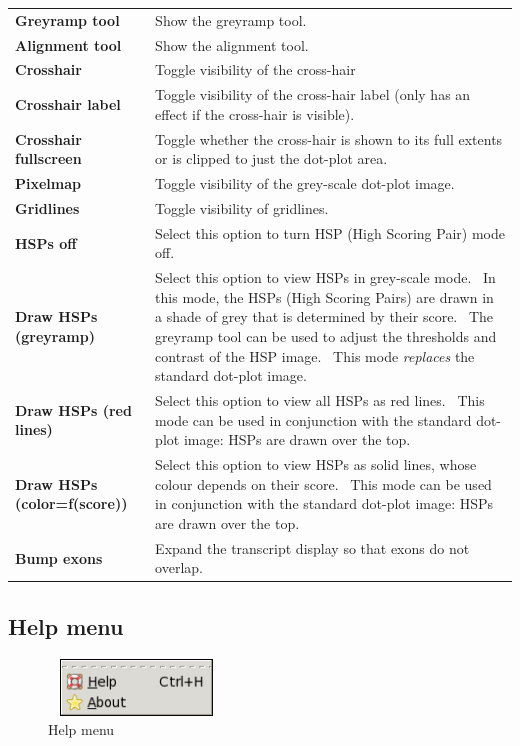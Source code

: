 \documentclass[letterpaper]{article}
\begin{document}
\begin{center}
\tablehead{}
\begin{supertabular}{p{2.649cm}p{10.858cm}}
\bfseries Greyramp tool &
 Show the greyramp tool.\\
\bfseries Alignment tool &
 Show the alignment tool.\\
\bfseries Crosshair &
 Toggle visibility of the cross-hair\\
\bfseries Crosshair label &
 Toggle visibility of the cross-hair label (only
has an effect if the cross-hair is visible).\\
\bfseries Crosshair fullscreen &
 Toggle whether the cross-hair is shown to its
full extents or is clipped to just the dot-plot area.\\
\bfseries Pixelmap &
 Toggle visibility of the grey-scale dot-plot
image.\\
\bfseries Gridlines &
 Toggle visibility of gridlines.\\
\bfseries HSPs off &
 Select this option to turn HSP (High Scoring
Pair) mode off.\\
\bfseries Draw HSPs (greyramp) &
 Select this option to view HSPs in grey-scale
mode. \ In this mode, the HSPs (High Scoring Pairs) are drawn in a
shade of grey that is determined by their score. \ The greyramp tool
can be used to adjust the thresholds and contrast of the HSP image.
\ This mode \textit{replaces} the standard dot-plot image.\\
\bfseries Draw HSPs (red lines) &
 Select this option to view all HSPs as red
lines. \ This mode can be used in conjunction with the standard
dot-plot image: HSPs are drawn over the top.\\
\bfseries Draw HSPs (color=f(score)) &
 Select this option to view HSPs as solid lines,
whose colour depends on their score. \ This mode can be used in
conjunction with the standard dot-plot image: HSPs are drawn over the
top.\\
\bfseries Bump exons &
 Expand the transcript display so that exons do
not overlap.\\
\end{supertabular}
\end{center}

{ \color[rgb]{0.30980393,0.5058824,0.7411765}\subsection[Help menu]{Help menu}}

\begin{figure}
 \centering
 \color[rgb]{0.30980393,0.5058824,0.7411765}
 \includegraphics[width=4.68cm,height=1.51cm]{img_menu_help.png}
 \caption{Help menu}
\end{figure}
\end{document}
